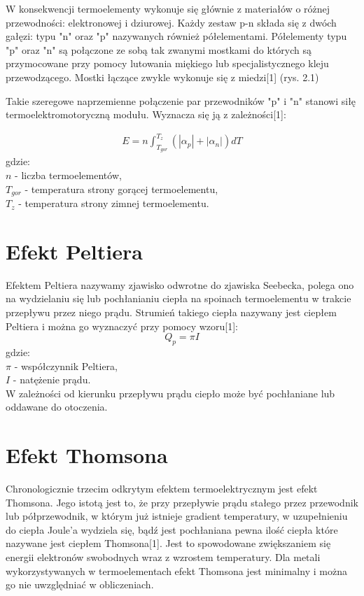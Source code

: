 \documentclass[oneside]{mgr}
\begin{document}
W konsekwencji termoelementy wykonuje się głównie z materiałów o różnej przewodności: elektronowej i dziurowej. Każdy zestaw p-n składa się z dwóch gałęzi: typu "n" oraz "p" nazywanych również półelementami. Półelementy typu "p" oraz "n" są połączone ze sobą tak zwanymi mostkami do których są przymocowane przy pomocy lutowania miękiego lub specjalistycznego kleju przewodzącego. Mostki łączące zwykle wykonuje się z miedzi[1] (rys. 2.1)

Takie szeregowe naprzemienne połączenie par przewodników "p" i "n" stanowi siłę termoelektromotoryczną modułu. Wyznacza się ją z zależności[1]:

\begin{eqnarray}
    E = n \int_{T_{gor}}^{T_z}(|\alpha_p|+|\alpha_n|)dT
\end{eqnarray}
gdzie: \\
$n$ - liczba termoelementów, \\
$T_{gor}$ - temperatura strony gorącej termoelementu, \\
$T_z$ - temperatura strony zimnej termoelementu.
\section{Efekt Peltiera}
Efektem Peltiera nazywamy zjawisko odwrotne do zjawiska Seebecka, polega ono na wydzielaniu się lub pochłanianiu ciepła na spoinach termoelementu w trakcie przepływu przez niego prądu. Strumień takiego ciepła nazywany jest ciepłem Peltiera i można go wyznaczyć przy pomocy wzoru[1]:
\begin{equation}
    Q_p = \pi I
\end{equation}
gdzie: \\
$\pi$ - współczynnik Peltiera, \\
$I$ - natężenie prądu. \\

W zależności od kierunku przepływu prądu ciepło może być pochłaniane lub oddawane do otoczenia.
\section{Efekt Thomsona}
Chronologicznie trzecim odkrytym efektem termoelektrycznym jest efekt Thomsona. Jego istotą jest to, że przy przepływie prądu stałego przez przewodnik lub półprzewodnik, w którym już istnieje gradient temperatury, w uzupełnieniu do ciepła Joule'a wydziela się, bądź jest pochłaniana pewna ilość ciepła które nazywane jest ciepłem Thomsona[1]. Jest to spowodowane zwiększaniem się energii elektronów swobodnych wraz z wzrostem temperatury. Dla metali wykorzystywanych w termoelementach efekt Thomsona jest minimalny i można go nie uwzględniać w obliczeniach.
\end{document}
